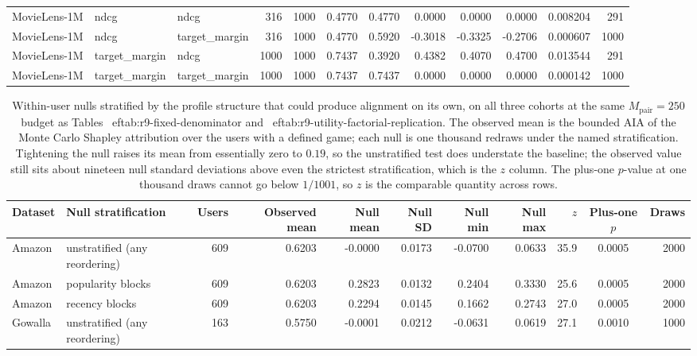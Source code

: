 \begin{table}[!htbp]
\begin{tabular}{@{}lllrrrrrrrrr@{}}
MovieLens-1M & ndcg & ndcg & 316 & 1000 & 0.4770 & 0.4770 & 0.0000 & 0.0000 & 0.0000 & 0.008204 & 291 \\
MovieLens-1M & ndcg & target_margin & 316 & 1000 & 0.4770 & 0.5920 & -0.3018 & -0.3325 & -0.2706 & 0.000607 & 1000 \\
MovieLens-1M & target_margin & ndcg & 1000 & 1000 & 0.7437 & 0.3920 & 0.4382 & 0.4070 & 0.4700 & 0.013544 & 291 \\
MovieLens-1M & target_margin & target_margin & 1000 & 1000 & 0.7437 & 0.7437 & 0.0000 & 0.0000 & 0.0000 & 0.000142 & 1000 \\
\bottomrule
\end{tabular}
\end{table}


\begin{table}[!htbp]\centering\scriptsize\setlength{\tabcolsep}{3pt}
\caption{Within-user nulls stratified by the profile structure that could produce alignment on its own, on all three cohorts at the same $M_{\mathrm{pair}}=250$ budget as Tables~
ef{tab:r9-fixed-denominator} and~
ef{tab:r9-utility-factorial-replication}. The observed mean is the bounded AIA of the Monte Carlo Shapley attribution over the users with a defined game; each null is one thousand redraws under the named stratification. Tightening the null raises its mean from essentially zero to $0.19$, so the unstratified test does understate the baseline; the observed value still sits about nineteen null standard deviations above even the strictest stratification, which is the $z$ column. The plus-one $p$-value at one thousand draws cannot go below $1/1001$, so $z$ is the comparable quantity across rows.}
\label{tab:r9-stratified-null}
\begin{tabular}{@{}llrrrrrrrcr@{}}
\toprule
Dataset & Null stratification & Users & Observed mean & Null mean & Null SD & Null min & Null max & $z$ & Plus-one $p$ & Draws \\
\midrule
Amazon & unstratified (any reordering) & 609 & 0.6203 & -0.0000 & 0.0173 & -0.0700 & 0.0633 & 35.9 & 0.0005 & 2000 \\
Amazon & popularity blocks & 609 & 0.6203 & 0.2823 & 0.0132 & 0.2404 & 0.3330 & 25.6 & 0.0005 & 2000 \\
Amazon & recency blocks & 609 & 0.6203 & 0.2294 & 0.0145 & 0.1662 & 0.2743 & 27.0 & 0.0005 & 2000 \\
Gowalla & unstratified (any reordering) & 163 & 0.5750 & -0.0001 & 0.0212 & -0.0631 & 0.0619 & 27.1 & 0.0010 & 1000 \\

\end{tabular}
\end{table}
